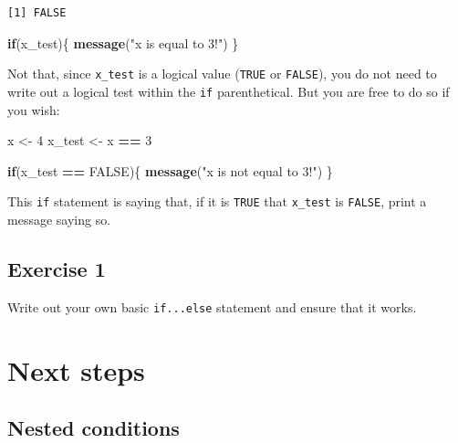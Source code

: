\documentclass[
]{book}
\newenvironment{Shaded}{\begin{snugshade}}{\end{snugshade}}
\newcommand{\ControlFlowTok}[1]{\textcolor[rgb]{0.13,0.29,0.53}{\textbf{#1}}}
\newcommand{\DecValTok}[1]{\textcolor[rgb]{0.00,0.00,0.81}{#1}}
\newcommand{\KeywordTok}[1]{\textcolor[rgb]{0.13,0.29,0.53}{\textbf{#1}}}
\newcommand{\NormalTok}[1]{#1}
\newcommand{\OperatorTok}[1]{\textcolor[rgb]{0.81,0.36,0.00}{\textbf{#1}}}
\newcommand{\OtherTok}[1]{\textcolor[rgb]{0.56,0.35,0.01}{#1}}
\newcommand{\StringTok}[1]{\textcolor[rgb]{0.31,0.60,0.02}{#1}}
\begin{document}
\begin{verbatim}
[1] FALSE
\end{verbatim}

\begin{Shaded}
\begin{Highlighting}[]
\ControlFlowTok{if}\NormalTok{(x_test)\{}
  \KeywordTok{message}\NormalTok{(}\StringTok{"x is equal to 3!"}\NormalTok{)}
\NormalTok{\}}
\end{Highlighting}
\end{Shaded}

Not that, since \texttt{x\_test} is a logical value (\texttt{TRUE} or \texttt{FALSE}), you do not need to write out a logical test within the \texttt{if} parenthetical. But you are free to do so if you wish:

\begin{Shaded}
\begin{Highlighting}[]
\NormalTok{x <-}\StringTok{ }\DecValTok{4}
\NormalTok{x_test <-}\StringTok{ }\NormalTok{x }\OperatorTok{==}\StringTok{ }\DecValTok{3}

\ControlFlowTok{if}\NormalTok{(x_test }\OperatorTok{==}\StringTok{ }\OtherTok{FALSE}\NormalTok{)\{}
  \KeywordTok{message}\NormalTok{(}\StringTok{"x is not equal to 3!"}\NormalTok{)}
\NormalTok{\}}
\end{Highlighting}
\end{Shaded}

This \texttt{if} statement is saying that, if it is \texttt{TRUE} that \texttt{x\_test} is \texttt{FALSE}, print a message saying so.

\hypertarget{exercise-1-7}{%
\subsection*{Exercise 1}\label{exercise-1-7}}

Write out your own basic \texttt{if...else} statement and ensure that it works.

\hypertarget{next-steps-1}{%
\section*{Next steps}\label{next-steps-1}}

\hypertarget{nested-conditions}{%
\subsection*{Nested conditions}\label{nested-conditions}}
\end{document}
